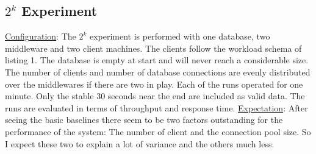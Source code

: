 \documentclass[11pt]{article}
\begin{document}
\subsection{$2^k$ Experiment}\label{sec:k-experiment}

\underline{Configuration}: The $2^k$ experiment is performed with one database, two middleware and two client machines. The clients follow the workload schema of listing 1. The database is empty at start and will never reach a considerable size. The number of clients and number of database connections are evenly distributed over the middlewares if there are two in play. Each of the runs operated for one minute. Only the stable 30 seconds near the end are included as valid data. The runs are evaluated in terms of throughput and response time.
\newline\underline{Expectation}: After seeing the basic baselines there seem to be two factors outstanding for the performance of the system: The number of client and the connection pool size. So I expect these two to explain a lot of variance and the others much less.
\end{document}
